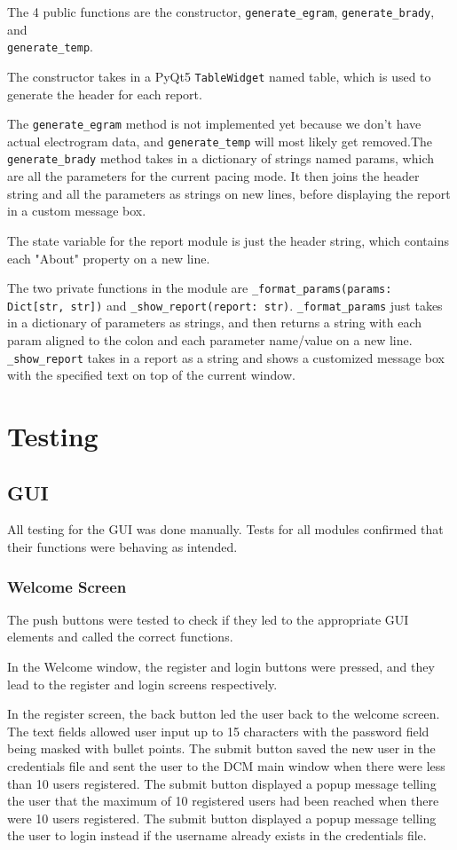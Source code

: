 \documentclass[12pt]{article}
\begin{document}
The 4 public functions are the constructor, \verb|generate_egram|, \verb|generate_brady|, and \\ \verb|generate_temp|.

The constructor takes in a PyQt5 \verb|TableWidget| named table, which is used to generate the header for each report.

The \verb|generate_egram| method is not implemented yet because we don't have actual electrogram data, and \verb|generate_temp| will most likely get removed.The \verb|generate_brady| method takes in a dictionary of strings named params, which are all the parameters for the current pacing mode. It then joins the header string and all the parameters as strings on new lines, before displaying the report in a custom message box.

The state variable for the report module is just the header string, which contains each "About" property on a new line.

The two private functions in the module are \verb|_format_params(params: Dict[str, str])| and \verb|_show_report(report: str)|. \verb|_format_params| just takes in a dictionary of parameters as strings, and then returns a string with each param aligned to the colon and each parameter name/value on a new line. \verb|_show_report| takes in a report as a string and shows a customized message box with the specified text on top of the current window.

\newpage
\section{Testing}
\subsection{GUI}
All testing for the GUI was done manually. Tests for all modules confirmed that their functions were behaving as intended.

\subsubsection{Welcome Screen}\label{Testing:WelcomeScreen}
The push buttons were tested to check if they led to the appropriate GUI elements and called the correct functions.

In the Welcome window, the register and login buttons were pressed, and they lead to the register and login screens respectively.

In the register screen, the back button led the user back to the welcome screen. The text fields allowed user input up to 15 characters with the password field being masked with bullet points. The submit button saved the new user in the credentials file and sent the user to the DCM main window when there were less than 10 users registered. The submit button displayed a popup message telling the user that the maximum of 10 registered users had been reached when there were 10 users registered. The submit button displayed a popup message telling the user to login instead if the username already exists in the credentials file.
\end{document}
